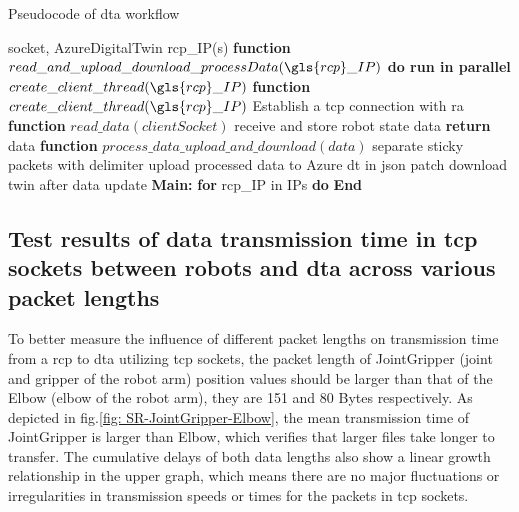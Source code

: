 \begin{breakablealgorithm}
    \caption{Pseudocode of \gls{dta} workflow}
    \label{alg:DTAgentPseudoCode}
    \begin{algorithmic}
     socket, AzureDigitalTwin
     \gls{rcp}\_IP(s)
    \State \textbf{function} {$read\_and\_upload\_download\_processData(\gls{rcp}\_IP)$}
        \State \qquad \textbf{do run in parallel}
            \State \qquad \qquad $create\_client\_thread(\gls{rcp}\_IP)$       
    \State \textbf{function} {$create\_client\_thread(\gls{rcp}\_IP)$}
        \State \qquad Establish a \gls{tcp} connection with \gls{ra}
        \State {}  
        \State {}    
    \State \textbf{function} {$read\_data(clientSocket)$}
        \State \qquad receive and store robot state data
        \State \qquad \textbf{return} data
    \State \textbf{function} {$process\_data\_upload\_and\_download(data)$}
        \State \qquad separate sticky packets with delimiter
        \State \qquad upload processed data to Azure \gls{dt} in json patch
        \State \qquad download twin after data update 
    \State \textbf{Main:}
        \State \qquad \textbf{for} \gls{rcp}\_IP in IPs \textbf{do}
        \State \qquad {}
        \State \textbf{End}
    \end{algorithmic}
\end{breakablealgorithm}


\subsection{Test results of data transmission 
time in \gls{tcp} sockets between robots and \gls{dta} across 
various packet lengths} \label{chap: Result-RCP-DTA}

To better measure the influence of different packet lengths on transmission time from 
a \gls{rcp} to \gls{dta} utilizing \gls{tcp} sockets, the packet length of JointGripper 
(joint and gripper of the robot arm) position values should be larger than that of the 
Elbow (elbow of the robot arm), they are 151 and 80 Bytes respectively. As depicted in 
fig.\ref{fig: SR-JointGripper-Elbow}, the mean transmission time of JointGripper is 
larger than Elbow, which verifies that larger files take longer to transfer. 
The cumulative delays of both data lengths also show a linear growth relationship in 
the upper graph, which means there are no major fluctuations or irregularities in 
transmission speeds or times for the packets in \gls{tcp} sockets. 


